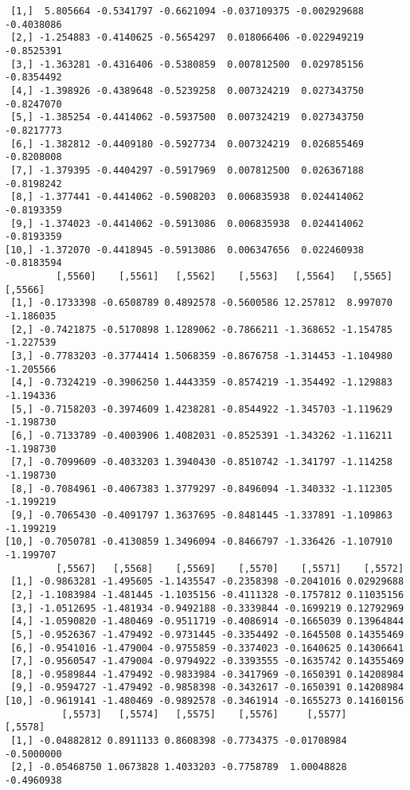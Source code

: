 \documentclass[
  letterpaper,
  DIV=11,
  numbers=noendperiod]{scrreprt}
\begin{document}
\begin{verbatim}
 [1,]  5.805664 -0.5341797 -0.6621094 -0.037109375 -0.002929688 -0.4038086
 [2,] -1.254883 -0.4140625 -0.5654297  0.018066406 -0.022949219 -0.8525391
 [3,] -1.363281 -0.4316406 -0.5380859  0.007812500  0.029785156 -0.8354492
 [4,] -1.398926 -0.4389648 -0.5239258  0.007324219  0.027343750 -0.8247070
 [5,] -1.385254 -0.4414062 -0.5937500  0.007324219  0.027343750 -0.8217773
 [6,] -1.382812 -0.4409180 -0.5927734  0.007324219  0.026855469 -0.8208008
 [7,] -1.379395 -0.4404297 -0.5917969  0.007812500  0.026367188 -0.8198242
 [8,] -1.377441 -0.4414062 -0.5908203  0.006835938  0.024414062 -0.8193359
 [9,] -1.374023 -0.4414062 -0.5913086  0.006835938  0.024414062 -0.8193359
[10,] -1.372070 -0.4418945 -0.5913086  0.006347656  0.022460938 -0.8183594
         [,5560]    [,5561]   [,5562]    [,5563]   [,5564]   [,5565]   [,5566]
 [1,] -0.1733398 -0.6508789 0.4892578 -0.5600586 12.257812  8.997070 -1.186035
 [2,] -0.7421875 -0.5170898 1.1289062 -0.7866211 -1.368652 -1.154785 -1.227539
 [3,] -0.7783203 -0.3774414 1.5068359 -0.8676758 -1.314453 -1.104980 -1.205566
 [4,] -0.7324219 -0.3906250 1.4443359 -0.8574219 -1.354492 -1.129883 -1.194336
 [5,] -0.7158203 -0.3974609 1.4238281 -0.8544922 -1.345703 -1.119629 -1.198730
 [6,] -0.7133789 -0.4003906 1.4082031 -0.8525391 -1.343262 -1.116211 -1.198730
 [7,] -0.7099609 -0.4033203 1.3940430 -0.8510742 -1.341797 -1.114258 -1.198730
 [8,] -0.7084961 -0.4067383 1.3779297 -0.8496094 -1.340332 -1.112305 -1.199219
 [9,] -0.7065430 -0.4091797 1.3637695 -0.8481445 -1.337891 -1.109863 -1.199219
[10,] -0.7050781 -0.4130859 1.3496094 -0.8466797 -1.336426 -1.107910 -1.199707
         [,5567]   [,5568]    [,5569]    [,5570]    [,5571]    [,5572]
 [1,] -0.9863281 -1.495605 -1.1435547 -0.2358398 -0.2041016 0.02929688
 [2,] -1.1083984 -1.481445 -1.1035156 -0.4111328 -0.1757812 0.11035156
 [3,] -1.0512695 -1.481934 -0.9492188 -0.3339844 -0.1699219 0.12792969
 [4,] -1.0590820 -1.480469 -0.9511719 -0.4086914 -0.1665039 0.13964844
 [5,] -0.9526367 -1.479492 -0.9731445 -0.3354492 -0.1645508 0.14355469
 [6,] -0.9541016 -1.479004 -0.9755859 -0.3374023 -0.1640625 0.14306641
 [7,] -0.9560547 -1.479004 -0.9794922 -0.3393555 -0.1635742 0.14355469
 [8,] -0.9589844 -1.479492 -0.9833984 -0.3417969 -0.1650391 0.14208984
 [9,] -0.9594727 -1.479492 -0.9858398 -0.3432617 -0.1650391 0.14208984
[10,] -0.9619141 -1.480469 -0.9892578 -0.3461914 -0.1655273 0.14160156
          [,5573]   [,5574]   [,5575]    [,5576]     [,5577]    [,5578]
 [1,] -0.04882812 0.8911133 0.8608398 -0.7734375 -0.01708984 -0.5000000
 [2,] -0.05468750 1.0673828 1.4033203 -0.7758789  1.00048828 -0.4960938

\end{verbatim}
\end{document}
